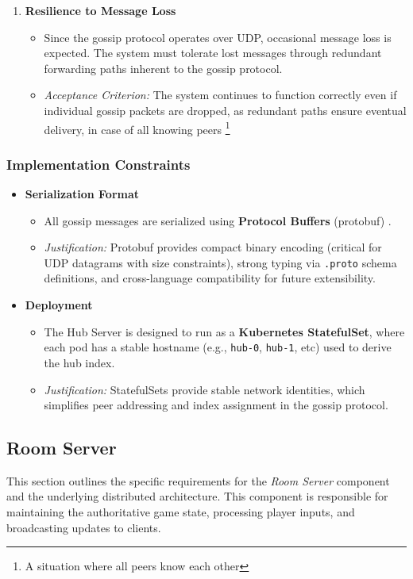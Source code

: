 \begin{enumerate}
    \item \textbf{Resilience to Message Loss}
    \begin{itemize}
        \item Since the gossip protocol operates over UDP, occasional message loss is expected. The system must tolerate lost messages through redundant forwarding paths inherent to the gossip protocol.
        \item \textit{Acceptance Criterion:} The system continues to function correctly even if individual gossip packets are dropped, as redundant paths ensure eventual delivery, in case of all knowing peers \footnote{A situation where all peers know each other}
    \end{itemize}
\end{enumerate}

\subsubsection{Implementation Constraints}
\begin{itemize}

    \item \textbf{Serialization Format}
    \begin{itemize}
        \item All gossip messages are serialized using \textbf{Protocol Buffers} (protobuf) \cite{protobuf}.
        \item \textit{Justification:} Protobuf provides compact binary encoding (critical for UDP datagrams with size constraints), strong typing via \texttt{.proto} schema definitions, and cross-language compatibility for future extensibility.
    \end{itemize}

    \item \textbf{Deployment}
    \begin{itemize}
        \item The Hub Server is designed to run as a \textbf{Kubernetes StatefulSet}, where each pod has a stable hostname (e.g., \texttt{hub-0}, \texttt{hub-1}, etc) used to derive the hub index.
        \item \textit{Justification:} StatefulSets provide stable network identities, which simplifies peer addressing and index assignment in the gossip protocol.
    \end{itemize}
\end{itemize}


\subsection{Room Server}
This section outlines the specific requirements for the \textit{Room Server} component and the underlying distributed architecture.
This component is responsible for maintaining the authoritative game state, processing player inputs, and broadcasting updates to clients.

